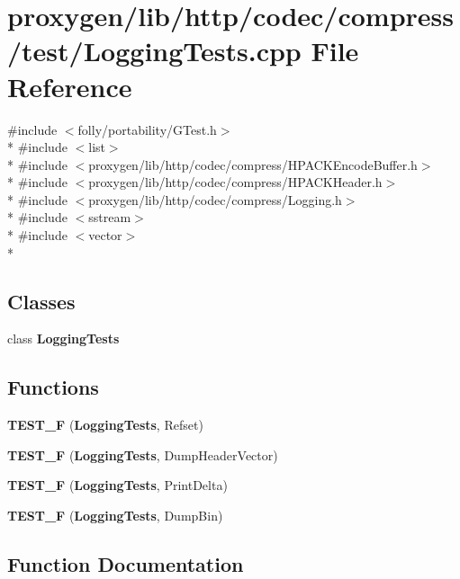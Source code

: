 \section{proxygen/lib/http/codec/compress/test/\+Logging\+Tests.cpp File Reference}
\label{http_2codec_2compress_2test_2LoggingTests_8cpp}
{\ttfamily \#include $<$folly/portability/\+G\+Test.\+h$>$}\\*
{\ttfamily \#include $<$list$>$}\\*
{\ttfamily \#include $<$proxygen/lib/http/codec/compress/\+H\+P\+A\+C\+K\+Encode\+Buffer.\+h$>$}\\*
{\ttfamily \#include $<$proxygen/lib/http/codec/compress/\+H\+P\+A\+C\+K\+Header.\+h$>$}\\*
{\ttfamily \#include $<$proxygen/lib/http/codec/compress/\+Logging.\+h$>$}\\*
{\ttfamily \#include $<$sstream$>$}\\*
{\ttfamily \#include $<$vector$>$}\\*
\subsection*{Classes}
\begin{DoxyCompactItemize}
\item 
class {\bf Logging\+Tests}
\end{DoxyCompactItemize}
\subsection*{Functions}
\begin{DoxyCompactItemize}
\item 
{\bf T\+E\+S\+T\+\_\+F} ({\bf Logging\+Tests}, Refset)
\item 
{\bf T\+E\+S\+T\+\_\+F} ({\bf Logging\+Tests}, Dump\+Header\+Vector)
\item 
{\bf T\+E\+S\+T\+\_\+F} ({\bf Logging\+Tests}, Print\+Delta)
\item 
{\bf T\+E\+S\+T\+\_\+F} ({\bf Logging\+Tests}, Dump\+Bin)
\end{DoxyCompactItemize}


\subsection{Function Documentation}
